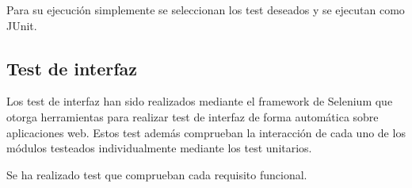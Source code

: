 
Para su ejecución simplemente se seleccionan los test deseados y se ejecutan como JUnit.


\subsection{Test de interfaz}

Los test de interfaz han sido realizados mediante el framework de Selenium que otorga herramientas para realizar test de interfaz de forma automática sobre aplicaciones web. Estos test además comprueban la interacción de cada uno de los módulos testeados individualmente mediante los test unitarios.

Se ha realizado test que comprueban cada requisito funcional.




